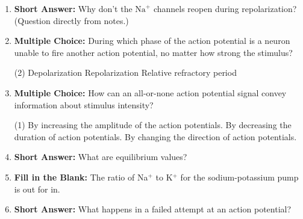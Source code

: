 \begin{enumerate}[label=\textbf{Q2.3.\arabic*}]
      \item \textbf{Short Answer:} Why don't the \(\text{Na}^{+}\) channels reopen during repolarization? (Question directly from notes.) \\

      \item \textbf{Multiple Choice:} During which phase of the action potential is a neuron unable to fire another action potential, no matter how strong the stimulus?
            \begin{tasks}[label=\textcolor{draculafg}{(\Alph*)}, item-format=\color{draculafg}, label-width=1.5em, item-indent=1.7em](2)
                  \task Depolarization
                  \task Repolarization
                  \task {}
                  \task Relative refractory period
            \end{tasks}

      \item \textbf{Multiple Choice:} How can an all-or-none action potential signal convey information about stimulus intensity?
            \begin{tasks}[label=\textcolor{draculafg}{(\Alph*)}, item-format=\color{draculafg}, label-width=1.5em, item-indent=1.7em](1)
                  \task By increasing the amplitude of the action potentials.
                  \task By decreasing the duration of action potentials.
                  \task By changing the direction of action potentials.
                  \task {}
            \end{tasks}

      \item \textbf{Short Answer:} What are equilibrium values? \\

      \item \textbf{Fill in the Blank:} The ratio of Na\(^{+}\) to K\(^{+}\) for the sodium-potassium pump is  out for  in. \\

      \item \textbf{Short Answer:} What happens in a failed attempt at an action potential? \\


\end{enumerate}
